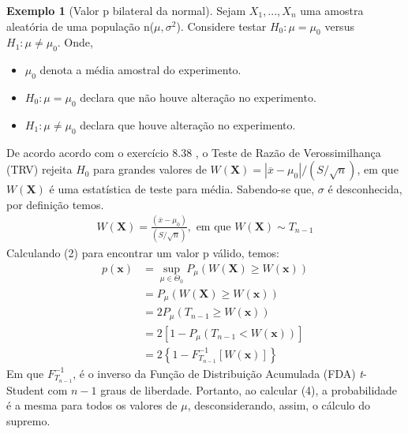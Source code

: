 \documentclass[10pt]{article}
\theoremstyle{plain}
\theoremstyle{remark}
\theoremstyle{definition}
\newtheorem{exe}[teor]{Exemplo}
\begin{document}
\begin{framed}
\begin{exe}[Valor p bilateral da normal]
Sejam $X_{1},...,X_{n}$ uma amostra aleatória de uma população n($\mu, \sigma^{2}$). Considere testar $H_0:\mu=\mu_0$ versus $H_1:\mu \neq \mu_0$. Onde,
\begin{itemize}
    \item $\mu_0$ denota a média amostral do experimento.
    \item $H_0:\mu=\mu_0$ declara que não houve alteração no experimento.
    \item $H_1:\mu \neq \mu_0$ declara que houve alteração no experimento.
\end{itemize}
De acordo acordo com o exercício 8.38 \cite[p.~408]{casella}, o Teste de Razão de Verossimilhança (TRV) rejeita $H_0$ para grandes valores de $W(\textbf{X})=|\overline{x}-\mu_0|/(S/\sqrt{n})$, em que $W(\textbf{X})$ é uma estatística de teste para média. Sabendo-se que, $\sigma$ é desconhecida, por definição temos.
\begin{align}
    W(\textbf{X})=\frac{(\overline{x}-\mu_0)}{(S/\sqrt{n})}, \text{ em que } W(\textbf{X}) \sim T_{n-1}
\end{align}
Calculando (2) para encontrar um valor p válido, temos:
\begin{align}
    p(\textbf{x})&=\sup_{\mu \in \Theta_{0}}P_{\mu}(W(\textbf{X}) \geq W(\textbf{x})) \nonumber \\
    &=P_{\mu}(W(\textbf{X}) \geq W(\textbf{x})) \nonumber \\
    &=2P_{\mu}(T_{n-1} \geq W(\textbf{x})) \nonumber \\
    &=2[1 - P_{\mu}(T_{n-1} < W(\textbf{x}))] \nonumber \\
    &=2\left\{1-F^{-1}_{T_{n-1}}[W(\textbf{x})]\right\}
\end{align}
Em que $F^{-1}_{T_{n-1}}$, é o inverso da Função de Distribuição Acumulada (FDA) \textit{t}-Student com $n-1$ graus de liberdade. Portanto, ao calcular (4), a probabilidade é a mesma para todos os valores de $\mu$, desconsiderando, assim, o cálculo do supremo.


\end{exe}
\end{framed}
\end{document}
